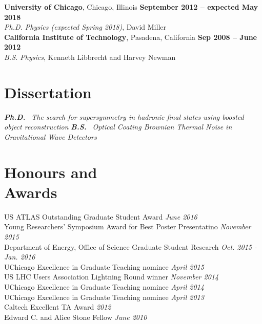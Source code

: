 \documentclass[margin,line]{resume}
\let\origsection\section%
\let\section\subsection%
\let\section\origsection%
\begin{document}
\begin{resume}
\textbf{University of Chicago}, Chicago, Illinois \hfill \textbf{September 2012 -- expected May 2018}\\
\textsl{Ph.D. Physics (expected Spring 2018)}, David Miller\\[5mm]
%
\textbf{California Institute of Technology}, Pasadena, California \hfill \textbf{ Sep 2008 -- June 2012}\\
\textsl{B.S. Physics}, Kenneth Libbrecht and Harvey Newman
%
%

\section{\mysidestyle Dissertation}

\textbf{\textsl{Ph.D.}} \href{https://kratsg.github.io/thesis/}{}~\textsl{The search for supersymmetry in hadronic final states using boosted object reconstruction}
\textbf{\textsl{B.S.}}\hspace{3mm} \href{https://www.dropbox.com/s/h0mpop96cn563bq/Thesis.pdf?dl=0}{}~\textsl{Optical Coating Brownian Thermal Noise in Gravitational Wave Detectors}

\section{\mysidestyle Honours and\\Awards}

US ATLAS Outstanding Graduate Student Award \hfill \textsl{June 2016}\\
Young Researchers' Symposium Award for Best Poster Presentatino \hfill \textsl{November 2015}\\
Department of Energy, Office of Science Graduate Student Research \hfill \textsl{Oct. 2015 - Jan. 2016}\\
UChicago Excellence in Graduate Teaching nominee \hfill \textsl{April 2015}\\
US LHC Users Association Lightning Round winner \hfill \textsl{November 2014}\\
UChicago Excellence in Graduate Teaching nominee \hfill \textsl{April 2014}\\
UChicago Excellence in Graduate Teaching nominee \hfill \textsl{April 2013}\\
Caltech Excellent TA Award \hfill \textsl{2012}\\
Edward C. and Alice Stone Fellow \hfill \textsl{June 2010}


\end{resume}
\end{document}
